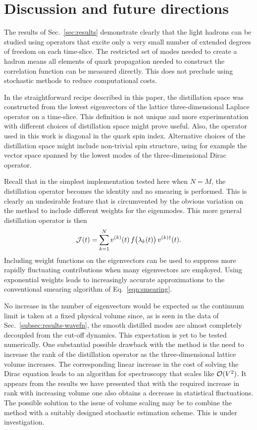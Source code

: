 \section{Discussion and future directions \label{sec:discussion}}

The results of Sec.~\ref{sec:results} demonstrate clearly that the light
hadrons can be studied using operators that excite only a very small number of
extended degrees of freedom on each time-slice. The restricted set of modes
needed to create a hadron means all elements of quark propagation needed to
construct the correlation function can be measured directly. This does not
preclude using stochastic methods \cite{Foley:2005ac} to reduce computational
costs.

In the straightforward recipe described in this paper, the distillation space
was constructed from the lowest eigenvectors of the lattice three-dimensional
Laplace operator on a time-slice. This definition is not unique and more
experimentation with different choices of distillation space might prove
useful. Also, the operator used in this work is diagonal in the quark spin
index. Alternative choices of the distillation space might include non-trivial
spin structure, using for example the vector space spanned by the lowest modes
of the three-dimensional Dirac operator.

Recall that in the simplest implementation tested here when $N=M$,
the distillation operator becomes the identity and no smearing is performed.
This is clearly an undesirable feature that is circumvented by the obvious
variation on the method to include different weights for the eigenmodes. This
more general distillation operator is then
\begin{equation}
        {\cal J}(t) = \sum_{k=1}^N v^{(k)}(t) \, f\big(\lambda_k(t)\big)
              \, v^{(k)\dag}(t).
\end{equation}
Including weight functions on the eigenvectors can be used to suppress
more rapidly fluctuating contributions when many eigenvectors are employed.
Using exponential weights leads to increasingly accurate approximations to the
conventional smearing algorithm of Eq.~\ref{eqn:smearing}.

No increase in the number of eigenvectors would be expected as the continuum
limit is taken at a fixed physical volume since, as is seen in the data of
Sec.~\ref{subsec:results-wavefn}, the smooth distilled modes are
almost completely decoupled from the cut-off dynamics. This expectation is yet
to be tested numerically.
One substantial possible drawback with the method is the need to increase the
rank of the distillation operator as the three-dimensional lattice volume
increases. The corresponding linear increase in the cost of solving the Dirac
equation leads to an algorithm for spectroscopy that scales like ${\cal
O}(V^2)$.
It appears from the results we have presented that with the required
increase in rank with increasing volume one also obtains a decrease in
statistical fluctuations.  The
possible solution to the issue of volume scaling may be to combine the method
with a suitably designed stochastic estimation scheme. This is under
investigation.

